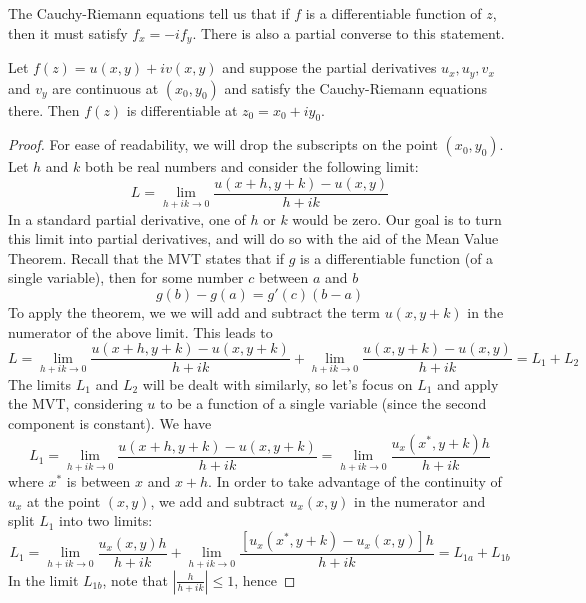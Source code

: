 \documentclass[handout]{ximera}
\begin{document}
The Cauchy-Riemann equations tell us that if $f$ is a differentiable function of $z$, 
then it must satisfy $f_x = -if_y$.
There is also a partial converse to this statement.  

\begin{theorem}
Let $f(z) = u(x,y) + iv(x,y)$ and suppose the partial derivatives $u_x, u_y, v_x$ and $v_y$ are 
continuous at $(x_0,y_0)$ and 
 satisfy the Cauchy-Riemann equations there. Then $f(z)$
is differentiable at $z_0 = x_0 + iy_0$.
\end{theorem}

\begin{proof}
For ease of readability, we will drop the subscripts on the point $(x_0,y_0)$.\\
Let $h$ and $k$ both be real numbers and consider the following limit:
\[
L = \lim_{h+ik \to 0} \frac{u(x+h, y+k) - u(x,y)}{h+ik} 
\]
In a standard partial derivative, one of $h$ or $k$ would be zero. 
Our goal is to turn this limit into partial derivatives,
and will do so with the aid of the Mean Value Theorem. Recall that the MVT states that 
if $g$ is a differentiable function (of a single variable), then for some number $c$ between $a$ and $b$
\[
g(b) -g(a) = g'(c)(b-a)
\]
To apply the theorem, we   
we will add and subtract the term $u(x,y+k)$ in the numerator of the above limit.
This leads to 
\[
L = \lim_{h+ik \to 0} \frac{u(x+h, y+k) - u(x,y+k)}{h+ik} + 
\lim_{h+ik \to 0} \frac{u(x, y+k) - u(x,y)}{h+ik} =  L_1 + L_2 
\]
The limits $L_1$ and $L_2$ will be dealt with similarly, so let's focus on $L_1$ and apply the MVT, 
considering $u$ to be a function of a single variable (since the second component is constant). We have
\[
L_1 = \lim_{h+ik \to 0} \frac{u(x+h, y+k) - u(x,y+k)}{h+ik} = \lim_{h+ik \to 0} \frac{u_x(x^*,y+k)h}{h+ik}
\]
where $x^*$ is between $x$ and $x+h$. In order to take advantage of the continuity of $u_x$  at 
the point $(x,y)$, 
we add and subtract $u_x(x,y)$ in the numerator and split $L_1$ into two limits:
\[
L_1 = \lim_{h+ik \to 0} \frac{u_x(x,y)h}{h+ik} + 
\lim_{h+ik \to 0} \frac{[u_x(x^*,y+k)-u_x(x,y)]h}{h+ik}= L_{1a} + L_{1b}
\]
In the limit $L_{1b}$, note that $\left|\frac{h}{h+ik}\right| \leq 1$, hence
 

\end{proof}
\end{document}
